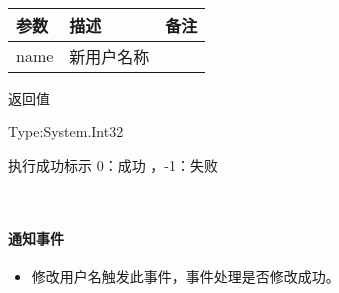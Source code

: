 \documentclass[letterpaper,10pt,english]{sphinxmanual}
\begin{document}
​


\begin{savenotes}\sphinxattablestart
\centering
\begin{tabulary}{\linewidth}[t]{|T|T|T|}
\hline
\sphinxstyletheadfamily 
参数
&\sphinxstyletheadfamily 
描述
&\sphinxstyletheadfamily 
备注
\\
\hline
name
&
新用户名称
&\\
\hline
\end{tabulary}
\par
\sphinxattableend\end{savenotes}

返回值

Type:System.Int32

执行成功标示 0：成功 ，-1：失败

​


\paragraph{通知事件}
\label{\detokenize{csharp_activex:id30}}\begin{itemize}
\item {} 
 修改用户名触发此事件，事件处理是否修改成功。

\end{itemize}
\end{document}
